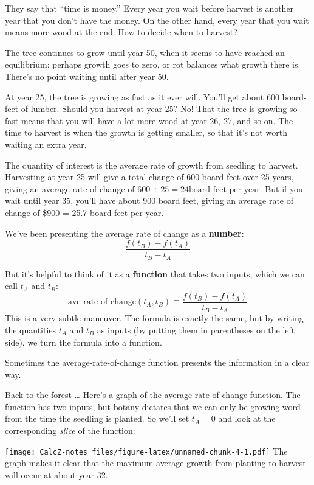 \documentclass[
]{book}
\begin{document}
They say that ``time is money.'' Every year you wait before harvest is another year that you don't have the money. On the other hand, every year that you wait means more wood at the end. How to decide when to harvest?

The tree continues to grow until year 50, when it seems to have reached an equilibrium: perhaps growth goes to zero, or rot balances what growth there is. There's no point waiting until after year 50.

At year 25, the tree is growing as fast as it ever will. You'll get about 600 board-feet of lumber. Should you harvest at year 25? No! That the tree is growing so fast means that you will have a lot more wood at year 26, 27, and so on. The time to harvest is when the growth is getting smaller, so that it's not worth waiting an extra year.

The quantity of interest is the average rate of growth from seedling to harvest. Harvesting at year 25 will give a total change of 600 board feet over 25 years, giving an average rate of change of \(600 \div 25 = 24 \mbox{board-feet-per-year}\). But if you wait until year 35, you'll have about 900 board feet, giving an average rate of change of \$900  = 25.7 \mbox{board-feet-per-year}.

We've been presenting the average rate of change as a \textbf{number}: \[\frac{f(t_B) - f(t_A)}{t_B - t_A}\]

But it's helpful to think of it as a \textbf{function} that takes two inputs, which we can call \(t_A\) and \(t_B\):
\[\text{ave_rate_of_change}(t_A, t_B) \equiv \frac{f(t_B) - f(t_A)}{t_B - t_A}\]
This is a very subtle maneuver. The formula is exactly the same, but by writing the quantities \(t_A\) and \(t_B\) as inputs (by putting them in parentheses on the left side), we turn the formula into a function.

Sometimes the average-rate-of-change function presents the information in a clear way.

Back to the forest \ldots{} Here's a graph of the average-rate-of change function. The function has two inputs, but botany dictates that we can only be growing word from the time the seedling is planted. So we'll set \(t_A = 0\) and look at the corresponding \emph{slice} of the function:

\texttt{[image: CalcZ-notes\_files/figure-latex/unnamed-chunk-4-1.pdf]}
The graph makes it clear that the maximum average growth from planting to harvest will occur at about year 32.
\end{document}
